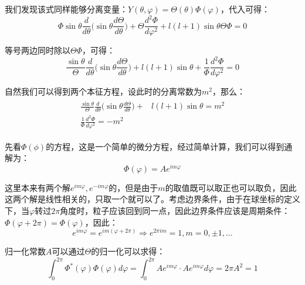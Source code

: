             我们发现该式同样能够分离变量：$Y(\theta,\varphi)=\Theta(\theta)\Phi(\varphi)$，代入可得：
            \begin{equation}
                \Phi\sin{\theta}\frac{d}{d\theta}\Big(\sin{\theta}\frac{d\Theta}{d\theta}\Big)+\Theta\frac{d^2\Phi}{d\varphi^2}+l(l+1)\sin{\theta}\Theta\Phi=0
            \end{equation}
            
            等号两边同时除以$\Theta\Phi$，可得：
            \begin{equation}
                \frac{\sin{\theta}}{\Theta}\frac{d}{d\theta}\Big(\sin{\theta}\frac{d\Theta}{d\theta}\Big)+l(l+1)\sin{\theta}+\frac{1}{\Phi}\frac{d^2\Phi}{d\varphi^2}=0
            \end{equation}
            
            自然我们可以得到两个本征方程，设此时的分离常数为$m^2$，那么：
            \begin{align}
                \begin{split}
                    \frac{\sin{\theta}}{\Theta}\frac{d}{d\theta}\Big(\sin{\theta}\frac{d\Theta}{d\theta}\Big)+&l(l+1)\sin{\theta}=m^2\\
                    \frac{1}{\Phi}\frac{d^2\Phi}{d\varphi^2}=-m^2
                \end{split}
            \end{align}
            
            先看$\Phi(\phi)$的方程，这是一个简单的微分方程，经过简单计算，我们可以得到通解为：
            \begin{equation}
                \Phi(\varphi)=Ae^{im\varphi}
            \end{equation}
            
            这里本来有两个解$e^{im\varphi},e^{-im\varphi}$的，但是由于$m$的取值既可以取正也可以取负，因此这两个解是线性相关的，只取一个就可以了。考虑边界条件，由于在球坐标的定义下，当$\varphi$转过$2\pi$角度时，粒子应该回到同一点，因此边界条件应该是周期条件：$\Phi(\varphi+2\pi)=\Phi(\varphi)$，因此：
            \begin{equation}
                e^{im\varphi}=e^{im(\varphi+2\pi)}\Rightarrow e^{2\pi im}=1,m=0,\pm 1,\dots
            \end{equation}
            
            归一化常数$A$可以通过$\Theta$的归一化可以求得：
            \begin{equation}
                \int_0^{2\pi}\Phi^*(\varphi)\Phi(\varphi)d\varphi=\int_0^{2\pi}A e^{im\varphi}\cdot Ae^{im\varphi}d\varphi=2\pi A^2=1
            \end{equation}
            
